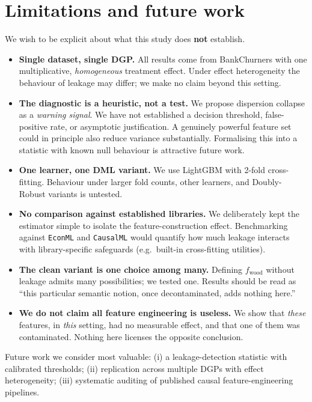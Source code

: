 \documentclass[11pt]{article}
\begin{document}
\section{Limitations and future work}

We wish to be explicit about what this study does \textbf{not} establish.
\begin{itemize}
\item \textbf{Single dataset, single DGP.} All results come from BankChurners with one multiplicative, \emph{homogeneous} treatment effect. Under effect heterogeneity the behaviour of leakage may differ; we make no claim beyond this setting.
\item \textbf{The diagnostic is a heuristic, not a test.} We propose dispersion collapse as a \emph{warning signal}. We have not established a decision threshold, false-positive rate, or asymptotic justification. A genuinely powerful feature set could in principle also reduce variance substantially. Formalising this into a statistic with known null behaviour is attractive future work.
\item \textbf{One learner, one DML variant.} We use LightGBM with 2-fold cross-fitting. Behaviour under larger fold counts, other learners, and Doubly-Robust variants is untested.
\item \textbf{No comparison against established libraries.} We deliberately kept the estimator simple to isolate the feature-construction effect. Benchmarking against \texttt{EconML} and \texttt{CausalML} would quantify how much leakage interacts with library-specific safeguards (e.g.\ built-in cross-fitting utilities).
\item \textbf{The clean variant is one choice among many.} Defining $f_{\text{wood}}$ without leakage admits many possibilities; we tested one. Results should be read as ``this particular semantic notion, once decontaminated, adds nothing here.''
\item \textbf{We do not claim all feature engineering is useless.} We show that \emph{these} features, in \emph{this} setting, had no measurable effect, and that one of them was contaminated. Nothing here licenses the opposite conclusion.
\end{itemize}

Future work we consider most valuable: (i) a leakage-detection statistic with calibrated thresholds; (ii) replication across multiple DGPs with effect heterogeneity; (iii) systematic auditing of published causal feature-engineering pipelines.
\end{document}
